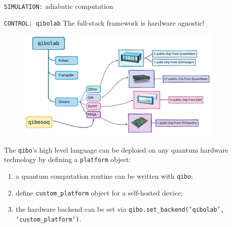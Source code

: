 \documentclass[20pt, final]{beamer}
\newlength{\sepwidth}
\newlength{\colwidth}
\newcommand{\separatorcolumn}{\begin{column}{\sepwidth}\end{column}}
\begin{document}
\begin{frame}[t]
\begin{columns}[t]
\begin{column}{\colwidth}
\begin{block}{\texttt{SIMULATION:} adiabatic computation}
  \end{block}


  \begin{block}{\texttt{CONTROL: qibolab}}
  The full-stack framework is hardware agnostic!
  \begin{figure}
    \includegraphics[width=1  \textwidth]{figures/qibolab_instruments.pdf}
  \end{figure}

  The \texttt{qibo}'s high level language can be deploied on any quantum hardware
  technology by defining a \texttt{platform} object:
  \begin{enumerate}
  \item a quantum computation routine can be written with \texttt{qibo};
  \item define \texttt{custom\_platform} object for a self-hosted device;
  \item the hardware backend can be set via \texttt{qibo.set\_backend('qibolab', 'custom\_platform')}.
  \end{enumerate}
  \end{block}
  \end{column}

  \separatorcolumn

\begin{column}{\colwidth}



\end{column}
\end{columns}
\end{frame}
\end{document}
